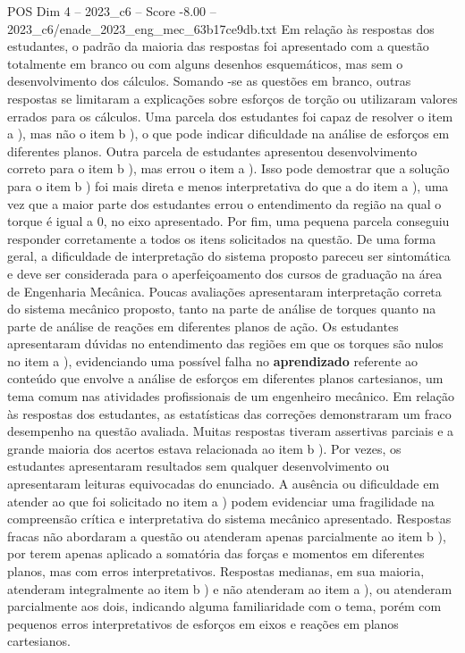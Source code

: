 \begin{textsample}{POS Dim 4 – 2023\_c6 – Score -8.00 – 2023\_c6/enade\_2023\_eng\_mec\_63b17ce9db.txt}
Em relação às respostas dos estudantes, o padrão da maioria das respostas foi apresentado com a questão totalmente em branco ou com alguns desenhos esquemáticos, mas sem o desenvolvimento dos cálculos.
Somando -se as questões em branco, outras respostas se limitaram a explicações sobre esforços de torção ou utilizaram valores errados para os cálculos.
Uma parcela dos estudantes foi capaz de resolver o item a ), mas não o item b ), o que pode indicar dificuldade na análise de esforços em diferentes planos.
Outra parcela de estudantes apresentou desenvolvimento correto para o item b ), mas errou o item a ).
Isso pode demostrar que a solução para o item b ) foi mais direta e menos interpretativa do que a do item a ), uma vez que a maior parte dos estudantes errou o entendimento da região na qual o torque é igual a 0, no eixo apresentado.
Por fim, uma pequena parcela conseguiu responder corretamente a todos os itens solicitados na questão.
De uma forma geral, a dificuldade de interpretação do sistema proposto pareceu ser sintomática e deve ser considerada para o aperfeiçoamento dos cursos de graduação na área de Engenharia Mecânica.
Poucas avaliações apresentaram interpretação correta do sistema mecânico proposto, tanto na parte de análise de torques quanto na parte de análise de reações em diferentes planos de ação.
Os estudantes apresentaram dúvidas no entendimento das regiões em que os torques são nulos no item a ), evidenciando uma possível falha no \textbf{aprendizado} referente ao conteúdo que envolve a análise de esforços em diferentes planos cartesianos, um tema comum nas atividades profissionais de um engenheiro mecânico.
Em relação às respostas dos estudantes, as estatísticas das correções demonstraram um fraco desempenho na questão avaliada.
Muitas respostas tiveram assertivas parciais e a grande maioria dos acertos estava relacionada ao item b ).
Por vezes, os estudantes apresentaram resultados sem qualquer desenvolvimento ou apresentaram leituras equivocadas do enunciado.
A ausência ou dificuldade em atender ao que foi solicitado no item a ) podem evidenciar uma fragilidade na compreensão crítica e interpretativa do sistema mecânico apresentado.
Respostas fracas não abordaram a questão ou atenderam apenas parcialmente ao item b ), por terem apenas aplicado a somatória das forças e momentos em diferentes planos, mas com erros interpretativos.
Respostas medianas, em sua maioria, atenderam integralmente ao item b ) e não atenderam ao item a ), ou atenderam parcialmente aos dois, indicando alguma familiaridade com o tema, porém com pequenos erros interpretativos de esforços em eixos e reações em planos cartesianos.

\end{textsample}
